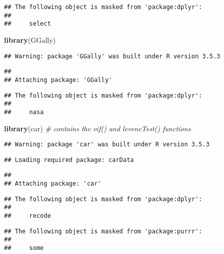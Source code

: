 \documentclass[12pt,]{article}
\newenvironment{Shaded}{\begin{snugshade}}{\end{snugshade}}
\newcommand{\KeywordTok}[1]{\textcolor[rgb]{0.13,0.29,0.53}{\textbf{#1}}}
\newcommand{\StringTok}[1]{\textcolor[rgb]{0.31,0.60,0.02}{#1}}
\newcommand{\CommentTok}[1]{\textcolor[rgb]{0.56,0.35,0.01}{\textit{#1}}}
\newcommand{\OtherTok}[1]{\textcolor[rgb]{0.56,0.35,0.01}{#1}}
\newcommand{\OperatorTok}[1]{\textcolor[rgb]{0.81,0.36,0.00}{\textbf{#1}}}
\newcommand{\NormalTok}[1]{#1}
\begin{document}
\begin{verbatim}
## The following object is masked from 'package:dplyr':
## 
##     select
\end{verbatim}

\begin{Shaded}
\begin{Highlighting}[]
\KeywordTok{library}\NormalTok{(GGally)}
\end{Highlighting}
\end{Shaded}

\begin{verbatim}
## Warning: package 'GGally' was built under R version 3.5.3
\end{verbatim}

\begin{verbatim}
## 
## Attaching package: 'GGally'
\end{verbatim}

\begin{verbatim}
## The following object is masked from 'package:dplyr':
## 
##     nasa
\end{verbatim}

\begin{Shaded}
\begin{Highlighting}[]
\KeywordTok{library}\NormalTok{(car) }\CommentTok{# contains the vif() and leveneTest() functions}
\end{Highlighting}
\end{Shaded}

\begin{verbatim}
## Warning: package 'car' was built under R version 3.5.3
\end{verbatim}

\begin{verbatim}
## Loading required package: carData
\end{verbatim}

\begin{verbatim}
## 
## Attaching package: 'car'
\end{verbatim}

\begin{verbatim}
## The following object is masked from 'package:dplyr':
## 
##     recode
\end{verbatim}

\begin{verbatim}
## The following object is masked from 'package:purrr':
## 
##     some
\end{verbatim}

\begin{Shaded}
\end{Shaded}
\end{document}
